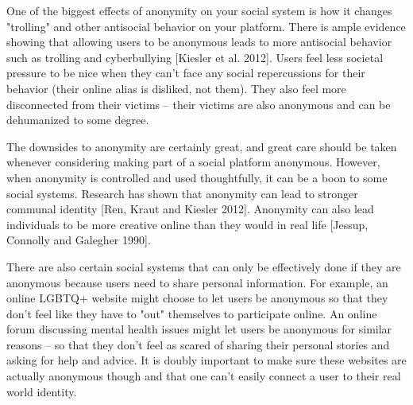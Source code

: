 \documentclass[class=book, crop=false]{standalone}
\begin{document}
One of the biggest effects of anonymity on your social system is how it changes "trolling" and other antisocial behavior on your platform. There is ample evidence showing that allowing users to be anonymous leads to more antisocial behavior such as trolling and cyberbullying [Kiesler et al. 2012]. Users feel less societal pressure to be nice when they can't face any social repercussions for their behavior (their online alias is disliked, not them). They also feel more disconnected from their victims -- their victims are also anonymous and can be dehumanized to some degree.

The downsides to anonymity are certainly great, and great care should be taken whenever considering making part of a social platform anonymous. However, when anonymity is controlled and used thoughtfully, it can be a boon to some social systems. Research has shown that anonymity can lead to stronger communal identity [Ren, Kraut and Kiesler 2012]. Anonymity can also lead individuals to be more creative online than they would in real life [Jessup, Connolly and Galegher 1990].

There are also certain social systems that can only be effectively done if they are anonymous because users need to share personal information. For example, an online LGBTQ+ website might choose to let users be anonymous so that they don't feel like they have to "out" themselves to participate online. An online forum discussing mental health issues might let users be anonymous for similar reasons -- so that they don't feel as scared of sharing their personal stories and asking for help and advice. It is doubly important to make sure these websites are actually anonymous though and that one can't easily connect a user to their real world identity.
\end{document}

